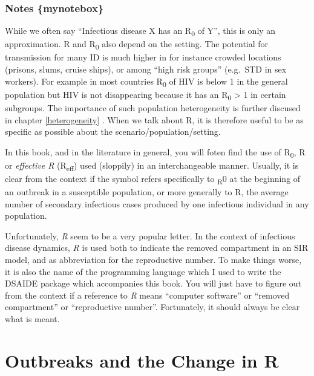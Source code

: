 \documentclass[]{book}
\theoremstyle{definition}
\theoremstyle{definition}
\theoremstyle{definition}
\theoremstyle{remark}
\begin{document}
\hypertarget{notes-mynotebox}{%
\subsubsection{Notes \{mynotebox\}}\label{notes-mynotebox}}

While we often say ``Infectious disease X has an R\textsubscript{0} of
Y'', this is only an approximation. R and R\textsubscript{0} also depend
on the setting. The potential for transmission for many ID is much
higher in for instance crowded locations (prisons, slums, cruise ships),
or among ``high risk groups'' (e.g.~STD in sex workers). For example in
most countries R\textsubscript{0} of HIV is below 1 in the general
population but HIV is not disappearing because it has an
R\textsubscript{0} \textgreater{} 1 in certain subgroups. The importance
of such population heterogeneity is further discused in chapter
\ref{heterogeneity} . When we talk about R, it is therefore useful to be
as specific as possible about the scenario/population/setting.

In this book, and in the literature in general, you will foten find the
use of R\textsubscript{0}, R or \emph{effective R}
(R\textsubscript{eff}) used (sloppily) in an interchangeable manner.
Usually, it is clear from the context if the symbol refers specifically
to \textsubscript{R}0 at the beginning of an outbreak in a susceptible
population, or more generally to R, the average number of secondary
infectious cases produced by one infectious individual in any
population.

Unfortunately, \emph{R} seem to be a very popular letter. In the context
of infectious disease dynamics, \emph{R} is used both to indicate the
removed compartment in an SIR model, and as abbreviation for the
reproductive number. To make things worse, it is also the name of the
programming language which I used to write the DSAIDE package which
accompanies this book. You will just have to figure out from the context
if a reference to \emph{R} means ``computer software'' or ``removed
compartment'' or ``reproductive number''. Fortunately, it should always
be clear what is meant.

\hypertarget{outbreaks-and-the-change-in-r}{%
\section{Outbreaks and the Change in
R}\label{outbreaks-and-the-change-in-r}}
\end{document}
